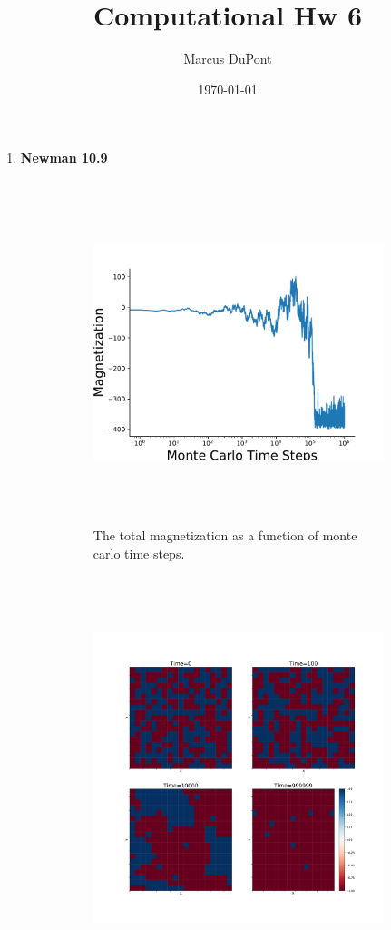 \documentclass{article}
\title{Computational Hw 6}
\author{Marcus DuPont}
\date{\today}
\begin{document}
\maketitle

\begin{enumerate}
    \item {\textbf{Newman 10.9}\\
    \begin{figure}[h!]
    \centering
    \begin{subfigure}[t]{0.5\textwidth}
        \centering
        \includegraphics[width=\textwidth, height=10cm]{mplot.pdf}
        \caption{The total magnetization as a function of monte carlo time steps.}
    \end{subfigure}%
    ~ 
    \begin{subfigure}[t]{0.5\textwidth}
        \centering
        \includegraphics[width=\textwidth, height=10cm]{config.pdf}

\end{subfigure}
\end{figure}}
\end{enumerate}
\end{document}
